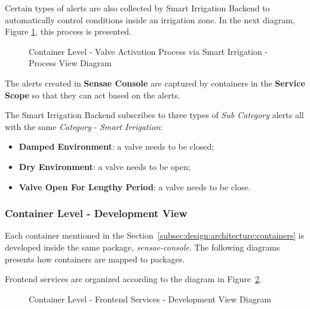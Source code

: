 Certain types of alerts are also collected by Smart Irrigation Backend to automatically control conditions inside an irrigation zone. In the next diagram, Figure \ref{fig:design:architecture:container:process:diagram:irrigation}, this process is presented.

\begin{figure}[H]
   \centering
   \resizebox{\columnwidth}{!}
   {
      
   }
   \caption[Container Level - Valve Activation Process via Smart Irrigation - Process View Diagram]{Container Level - Valve Activation Process via Smart Irrigation - Process View Diagram}
   \label{fig:design:architecture:container:process:diagram:irrigation}
\end{figure}

The alerts created in \textbf{Sensae Console} are captured by containers in the \textbf{Service Scope} so that they can act based on the alerts.

The Smart Irrigation Backend subscribes to three types of \textit{Sub Category} alerts all with the same \textit{Category} - \textit{Smart Irrigation}:

\begin{itemize}
   \item \textbf{Damped Environment}: a valve needs to be closed;
   \item \textbf{Dry Environment}: a valve needs to be open;
   \item \textbf{Valve Open For Lengthy Period}: a valve needs to be close.
\end{itemize}

\subsubsection{Container Level - Development View}
\label{subsubsec:design:architecture:container:development}

Each container mentioned in the Section~\ref{subsec:design:architecture:containers} is developed inside the same package, \textit{sensae-console}. The following diagrams presents how containers are mapped to packages.

Frontend services are organized according to the diagram in Figure~\ref{fig:design:architecture:container:process:diagram:development:frontend}.

\begin{figure}[H]
   \centering
   \resizebox{\columnwidth}{!}
   {
      
   }
   \caption[Container Level - Frontend Services - Development View Diagram]{Container Level - Frontend Services - Development View Diagram}
   \label{fig:design:architecture:container:process:diagram:development:frontend}
\end{figure}

